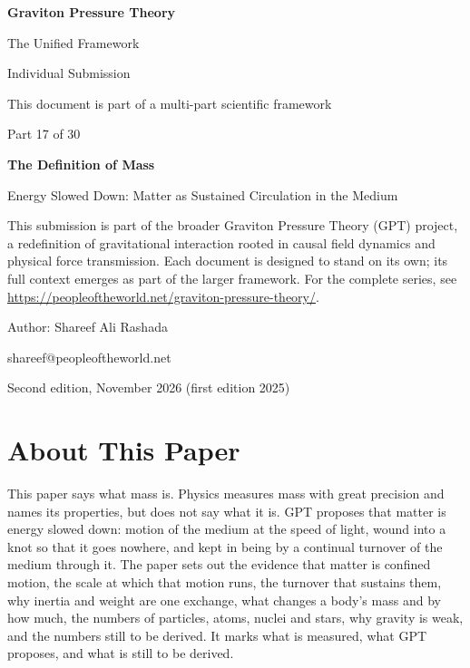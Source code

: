 \documentclass[11pt,a4paper]{article}
\begin{document}
\renewcommand{\thetable}{17.\arabic{table}}
\begin{titlepage}
\centering
\vspace*{1.5cm}
{\Huge\bfseries Graviton Pressure Theory\par}
\vspace{0.4cm}
{\Large The Unified Framework\par}
{\large Individual Submission\par}
\vspace{0.3cm}
{\normalsize This document is part of a multi-part scientific framework\par}
\vspace{1.6cm}
{\large Part 17 of 30\par}
\vspace{0.6cm}
{\huge\bfseries The Definition of Mass\par}
\vspace{0.5cm}
{\Large Energy Slowed Down: Matter as Sustained Circulation in the Medium\par}
\vspace{1.4cm}
\begin{minipage}{0.82\textwidth}\centering\small
This submission is part of the broader Graviton Pressure Theory (GPT) project, a redefinition of gravitational interaction rooted in causal field dynamics and physical force transmission. Each document is designed to stand on its own; its full context emerges as part of the larger framework. For the complete series, see \url{https://peopleoftheworld.net/graviton-pressure-theory/}.
\end{minipage}
\vfill
{\large Author: Shareef Ali Rashada\par}
{\normalsize shareef@peopleoftheworld.net\par}
\vspace{0.3cm}
{\normalsize Second edition, November 2026 \quad (first edition 2025)\par}
\end{titlepage}

\tableofcontents
\newpage

\section*{About This Paper}

This paper says what mass is. Physics measures mass with great precision and names its properties, but does not say what it is. GPT proposes that matter is energy slowed down: motion of the medium at the speed of light, wound into a knot so that it goes nowhere, and kept in being by a continual turnover of the medium through it. The paper sets out the evidence that matter is confined motion, the scale at which that motion runs, the turnover that sustains them, why inertia and weight are one exchange, what changes a body's mass and by how much, the numbers of particles, atoms, nuclei and stars, why gravity is weak, and the numbers still to be derived. It marks what is measured, what GPT proposes, and what is still to be derived.
\end{document}
